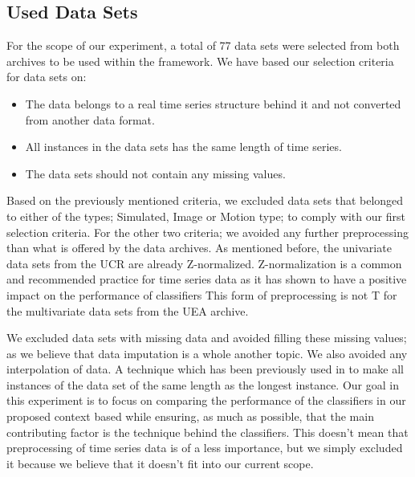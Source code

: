 \subsection{Used Data Sets}
\label{used data sets}
For the scope of our experiment, a total of 77 data sets were selected from both archives to be used within the framework.
We have based our selection criteria for data sets on:
\begin{itemize}
    \item The data belongs to a real time series structure behind it and not converted from another data format.
    \item All instances in the data sets has the same length of time series.
    \item The data sets should not contain any missing values.
\end{itemize}
Based on the previously mentioned criteria, we excluded data sets that belonged to either of the types; Simulated, Image or Motion type; to comply with our first selection criteria.
For the other two criteria; we avoided any further preprocessing than what is offered by the data archives.
As mentioned before, the univariate data sets from the UCR are already Z-normalized.
Z-normalization is a common and recommended practice for time series data as it has shown to have a positive impact on the performance of classifiers \cite{bagnall2017great,fawaz2019deepreview}
This form of preprocessing is not T for the multivariate data sets from the UEA archive.

We excluded data sets with missing data and avoided filling these missing values; as we believe that data imputation is a whole another topic.
We also avoided any interpolation of data. A technique which has been previously used in \cite{ratanamahatana2005three, fawaz2019deepreview} to make all instances of the data set of the same length as the longest instance.
Our goal in this experiment is to focus on comparing the performance of the classifiers in our proposed context based while ensuring, as much as possible, that the main contributing factor is the technique behind the classifiers.
This doesn't mean that preprocessing of time series data is of a less importance, but we simply excluded it because we believe that it doesn't fit into our current scope.

